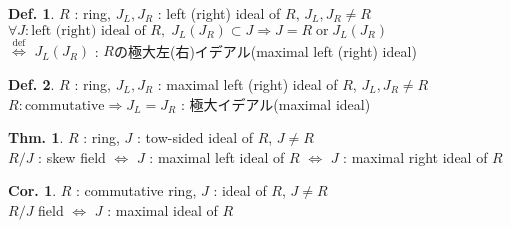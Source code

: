 \documentclass[uplatex,dvipdfmx,9pt]{beamer}
\newcommand{\defarrow}{\overset{\mathrm{def}}{\Leftrightarrow}}
\newcounter{textThmCount}
\theoremstyle{definition} %
\newtheorem{defn}{Def.}[subsection] %
\newtheorem{thmText}[textThmCount]{Thm.}
\newtheorem{corText}{Cor.}[textThmCount] %
\theoremstyle{example}
\begin{document}
    \begin{frame}

      \begin{defn}
        $R$ : ring, \; $J_L, J_R$ : left (right) ideal of $R$, \; $J_L, J_R \neq R$ \\
        $\forall J : \text{left (right) ideal of $R$}, \; J_L(J_R) \subset J \Rightarrow J = R \; \text{or} \; J_L(J_R)$ \\
        $\defarrow$ $J_L(J_R)$ : $R$の\alert{極大左(右)イデアル(maximal left (right) ideal)}
      \end{defn}

      \begin{defn}
        $R$ : ring, \; $J_L, J_R$ : maximal left (right) ideal of $R$, \; $J_L, J_R \neq R$ \\
        $R : \text{commutative} \Rightarrow J_L = J_R$ : \alert{極大イデアル(maximal ideal)}
      \end{defn}

      \begin{thmText}
        $R$ : ring, \; $J$ : tow-sided ideal of $R$, \; $J \neq R$ \\
        $R/J$ : skew field $\Leftrightarrow$ $J$ : maximal left ideal of $R$ $\Leftrightarrow$ $J$ : maximal right ideal of $R$
      \end{thmText}

      \begin{corText}
        $R$ : commutative ring, \; $J$ : ideal of $R$, \; $J \neq R$ \\
        $R/J$ field $\Leftrightarrow$ $J$ : maximal ideal of $R$
      \end{corText}
      
    \end{frame}
\end{document}
